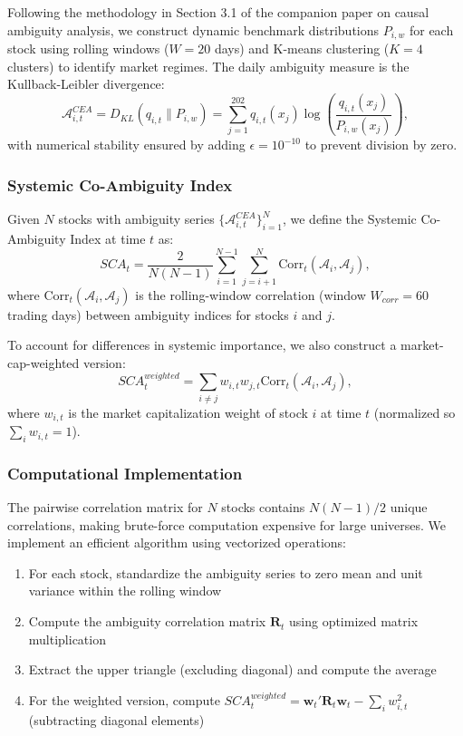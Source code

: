 \documentclass[preprint,12pt,authoryear]{elsarticle}
\begin{document}
Following the methodology in Section 3.1 of the companion paper on causal ambiguity analysis, we construct dynamic benchmark distributions $P_{i,w}$ for each stock using rolling windows ($W = 20$ days) and K-means clustering ($K = 4$ clusters) to identify market regimes. The daily ambiguity measure is the Kullback-Leibler divergence:
\begin{equation}
\mathcal{A}^{CEA}_{i,t} = D_{KL}(q_{i,t} \| P_{i,w}) = \sum_{j=1}^{202} q_{i,t}(x_j) \log\left(\frac{q_{i,t}(x_j)}{P_{i,w}(x_j)}\right),
\end{equation}
with numerical stability ensured by adding $\epsilon = 10^{-10}$ to prevent division by zero.

\subsubsection{Systemic Co-Ambiguity Index}

Given $N$ stocks with ambiguity series $\{\mathcal{A}^{CEA}_{i,t}\}_{i=1}^{N}$, we define the Systemic Co-Ambiguity Index at time $t$ as:
\begin{equation}
SCA_t = \frac{2}{N(N-1)} \sum_{i=1}^{N-1} \sum_{j=i+1}^{N} \text{Corr}_t(\mathcal{A}_{i}, \mathcal{A}_{j}),
\end{equation}
where $\text{Corr}_t(\mathcal{A}_{i}, \mathcal{A}_{j})$ is the rolling-window correlation (window $W_{corr} = 60$ trading days) between ambiguity indices for stocks $i$ and $j$.

To account for differences in systemic importance, we also construct a market-cap-weighted version:
\begin{equation}
SCA_t^{weighted} = \sum_{i \neq j} w_{i,t} w_{j,t} \text{Corr}_t(\mathcal{A}_{i}, \mathcal{A}_{j}),
\end{equation}
where $w_{i,t}$ is the market capitalization weight of stock $i$ at time $t$ (normalized so $\sum_i w_{i,t} = 1$).

\subsubsection{Computational Implementation}

The pairwise correlation matrix for $N$ stocks contains $N(N-1)/2$ unique correlations, making brute-force computation expensive for large universes. We implement an efficient algorithm using vectorized operations:
\begin{enumerate}
\item For each stock, standardize the ambiguity series to zero mean and unit variance within the rolling window
\item Compute the ambiguity correlation matrix $\mathbf{R}_t$ using optimized matrix multiplication
\item Extract the upper triangle (excluding diagonal) and compute the average
\item For the weighted version, compute $SCA_t^{weighted} = \mathbf{w}_t' \mathbf{R}_t \mathbf{w}_t - \sum_i w_{i,t}^2$ (subtracting diagonal elements)
\end{enumerate}
\end{document}
